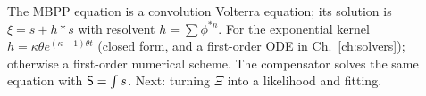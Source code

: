 \begin{recap}
The MBPP equation is a convolution Volterra equation; its solution is
$\xi=s+h*s$ with resolvent $h=\sum\phi^{*n}$. For the exponential kernel
$h=\kappa\theta e^{(\kappa-1)\theta t}$ (closed form, and a first-order ODE in
Ch.~\ref{ch:solvers}); otherwise a first-order numerical scheme. The compensator
solves the same equation with $\mathsf{S}=\int s$. Next: turning $\Xi$ into a
likelihood and fitting.
\end{recap}

